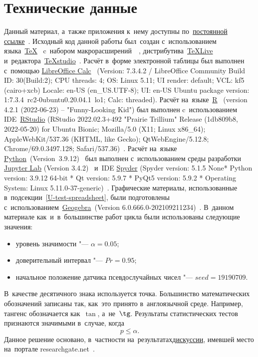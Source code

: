 \documentclass[]{scrreprt}
\begin{document}
\chapter{Технические данные}
Данный материал, а~также приложения к~нему доступны по~\href{https://github.com/Kirill-Murashev/AI_for_valuers_book/tree/main/Parts-Chapters/Mann-Whitney-Wilcoxon}{постоянной ссылке}~\cite{Murashev:u-test}. Исходный код данной работы был~создан с~использованием языка~\href{https://www.ctan.org/}{\TeX}~\cite{TeX:site} c~набором макрорасширений~\href{https://www.latex-project.org/}{\LaTeXe}~\cite{LaTeX:site}, дистрибутива~\href{https://www.tug.org/texlive/}{TeXLive}~\cite{TeXLive:site} и~редактора~\href{https://www.texstudio.org/}{TeXstudio}~\cite{TeXstudio:site}. Расчёт в~форме электронной таблицы был выполнен с~помощью \href{https://www.libreoffice.org/discover/calc/}{LibreOffice Calc}~\cite{LO:Calc} (Version: 7.3.4.2 / LibreOffice Community Build ID: 30(Build:2); CPU threads: 4; OS: Linux 5.11; UI render: default; VCL: kf5 (cairo+xcb) Locale: en-US (en\_US.UTF-8); UI: en-US Ubuntu package version: 1:7.3.4~rc2-0ubuntu0.20.04.1~lo1; Calc: threaded). Расчёт на~языке~\href{https://www.r-project.org/}{R}~\cite{R_language} (version 4.2.1 (2022-06-23) -- "Funny-Looking Kid") был выполнен c~использованием IDE~\href{https://www.rstudio.com/}{RStudio} (RStudio 2022.02.3+492 "Prairie Trillium" Release (1db809b8, 2022-05-20) for Ubuntu Bionic; Mozilla/5.0 (X11; Linux x86\_64); AppleWebKit/537.36 (KHTML, like Gecko); QtWebEngine/5.12.8; Chrome/69.0.3497.128; Safari/537.36)~\cite{RStudio:official_site}. Расчёт на~языке \href{https://www.python.org/}{Python}~(Version~3.9.12)~\cite{Python:site} был выполнен с~использованием среды разработки \href{https://jupyter.org}{Jupyter Lab} (Version 3.4.2)~\cite{Jupyter:site} и~IDE \href{https://www.spyder-ide.org/}{Spyder} (Spyder version: 5.1.5 None* Python version: 3.9.12 64-bit * Qt version: 5.9.7 * PyQt5 version: 5.9.2
* Operating System: Linux 5.11.0-37-generic)~\cite{Spyder:site}. Графические материалы, использованные в~подсекции~\ref{U-test-spreadsheet}, были подготовлены с~использованием~\href{Geogebra:official-site}{Geogebra}~(Version 6.0.666.0-202109211234)~\cite{Geogebra:official-site}.
В~данном материале как~и~в~большинстве работ цикла были использованы следующие значения:
\begin{itemize}
	\item уровень значимости "--- $\alpha = 0.05$;
	\item доверительный интервал "--- $Pr = 0.95$;
	\item начальное положение датчика псевдослучайных чисел "--- $seed = 19190709$.
\end{itemize}
В~качестве десятичного знака используется точка. Большинство математических обозначений записаны так, как~это принято в~англоязычной среде. Например, тангенс обозначается как~$\tan$, а~не~$\tg$. Результаты статистических тестов признаются значимыми в~случае, когда
\begin{equation}\label{eq:ignificance}
 p \leq \alpha.
\end{equation}
Данное решение основано, в~частности на~результатах\href{researchgate.net}{дискуссии}, имевшей место на~портале researchgate.net~\cite{RG:p-equals-alpha}.
%
\end{document}
